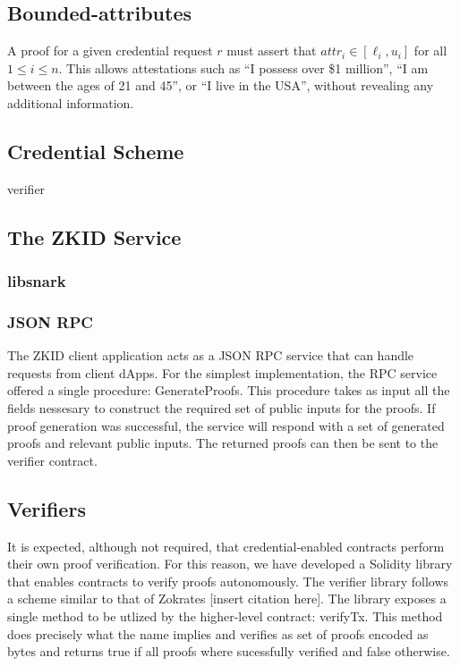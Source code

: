 \documentclass[11 pt]{extarticle}
\theoremstyle{remark}
\begin{document}
\subsection{Bounded-attributes}
A proof for a given credential request $r$ must assert that $attr_i \in [\ell_i,
u_i]$ for all $1\leq i\leq n$. This allows attestations such as ``I possess over
\$1 million'', ``I am between the ages of 21 and 45'', or ``I live in the USA'',
without revealing any additional information.

\subsection{Credential Scheme}
verifier


\subsection{The ZKID Service}

\subsubsection{libsnark}

\subsubsection{JSON RPC}

The ZKID client application acts as a JSON RPC service that can handle requests from client dApps. For the simplest implementation,
the RPC service offered a single procedure: GenerateProofs. This procedure takes as input all the fields nessesary
to construct the required set of public inputs for the proofs. If proof generation was successful, the service will respond with a 
set of generated proofs and relevant public inputs. The returned proofs can then be sent to the verifier contract.  

\subsection{Verifiers}

It is expected, although not required, that credential-enabled contracts perform their own proof verification. For this reason, we have
developed a Solidity library that enables contracts to verify proofs autonomously. The verifier library follows a scheme similar to that
of Zokrates [insert citation here]. The library exposes a single method to be utlized by the higher-level contract: verifyTx. This 
method does precisely what the name implies and verifies as set of proofs encoded as bytes and returns true if all proofs where sucessfully
verified and false otherwise. 
\end{document}
